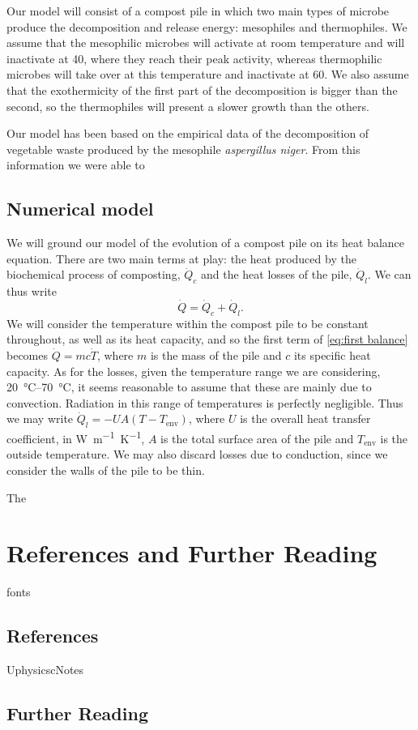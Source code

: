 \documentclass[12pt, a4paper, twocolumn]{article}
\numberwithin{table}{section}
\numberwithin{figure}{section}
\numberwithin{equation}{section}
\begin{document}
Our model will consist of a compost pile in which two main types of microbe produce the decomposition and release energy: mesophiles and thermophiles. We assume that the mesophilic microbes will activate at room temperature and will inactivate at \si{40}{\celsius}, where they reach their peak activity, whereas thermophilic microbes will take over at this temperature and inactivate at \si{60}{\celsius}. We also assume that the exothermicity of the first part of the decomposition is bigger than the second, so the thermophiles will present a slower growth than the others.

Our model has been based on the empirical data of the decomposition of vegetable waste produced by the mesophile \textit{aspergillus niger}\cite{mesophile}. From this information we were able to 

\subsection{Numerical model}
We will ground our model of the evolution of a compost pile on its heat balance equation. There are two main terms at play: the heat produced by the biochemical process of composting, \( \dot{Q}_c \) and the heat losses of the pile, \( \dot{Q}_l \). We can thus write
\begin{equation} \label{eq:first balance}
	\dot{Q} = \dot{Q}_c + \dot{Q}_l. 
\end{equation}
We will consider the temperature within the compost pile to be constant throughout, as well as its heat capacity, and so the first term of \cref{eq:first balance} becomes \( \dot{Q} = mc\dot{T} \), where \( m \) is the mass of the pile and \( c \) its specific heat capacity. As for the losses, given the temperature range we are considering, \SIrange{20}{70}{\celsius}, it seems reasonable to assume that these are mainly due to convection. Radiation in this range of temperatures is perfectly negligible. Thus we may write \( \dot{Q}_l = -UA\left(T - T_\text{env}\right) \), where \( U \) is the overall heat transfer coefficient, in \si{W.m^{-1}.K^{-1}}, \( A \) is the total surface area of the pile and \( T_\text{env} \) is the outside temperature. We may also discard losses due to conduction, since we consider the walls of the pile to be thin.

The 

\clearpage
\appendix
\section{References and Further Reading}
\begin{btSect}{fonts}
	
	\subsection*{References}	
	\btPrintCited
\end{btSect}

\begin{btSect}{UphysicscNotes}
	
	\subsection*{Further Reading}	
	\btPrintNotCited
\end{btSect}
\end{document}
